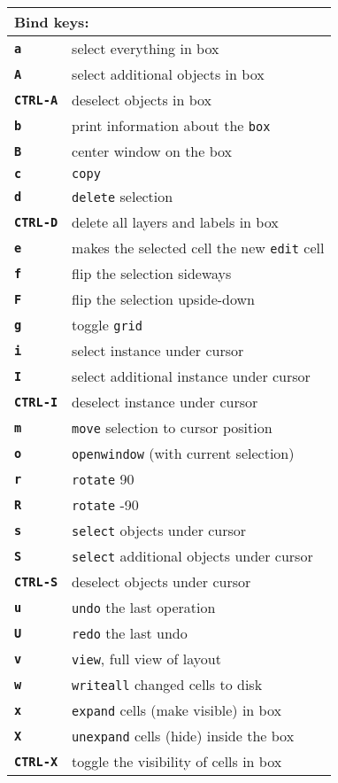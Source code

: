 \documentclass[10pt,a4paper]{article}
\newcommand{\key}[1]{\texttt{\textbf{#1}}}
\newcommand{\mac}[1]{\texttt{#1}}
\begin{document}
	\begin{tabular}{p{}p{}}
		\toprule
		\multicolumn{2}{l}{Bind keys:}\\
		\midrule
		\key{a} & select everything in box\\
		\key{A} & select additional objects in box\\
		\key{CTRL-A} & deselect objects in box\\
		\key{b} & print information about the \mac{box}\\
		\key{B} & center window on the box\\
		\key{c} & \mac{copy}\\
		\key{d} & \mac{delete} selection\\
		\key{CTRL-D} & delete all layers and labels in box\\
		\key{e} & makes the selected cell the new \mac{edit} cell\\
		\key{f} & flip the selection sideways\\
		\key{F} & flip the selection upside-down\\
		\key{g} & toggle \mac{grid}\\
		\key{i} & select instance under cursor\\
		\key{I} & select additional instance under cursor\\
		\key{CTRL-I} & deselect instance under cursor\\
		\key{m} & \mac{move} selection to cursor position\\
		\key{o} & \mac{openwindow} (with current selection)\\
		\key{r} & \mac{rotate} 90\\
		\key{R} & \mac{rotate} -90\\
		\key{s} & \mac{select} objects under cursor\\
		\key{S} & \mac{select} additional objects under cursor\\
		\key{CTRL-S} & deselect objects under cursor\\
		\key{u} & \mac{undo} the last operation\\
		\key{U} & \mac{redo} the last undo\\
		\key{v} & \mac{view}, full view of layout\\
		\key{w} & \mac{writeall} changed cells to disk\\
		\key{x} & \mac{expand} cells (make visible) in box\\
		\key{X} & \mac{unexpand} cells (hide) inside the box\\
		\key{CTRL-X} & toggle the visibility of cells in box\\

\end{tabular}
\end{document}
